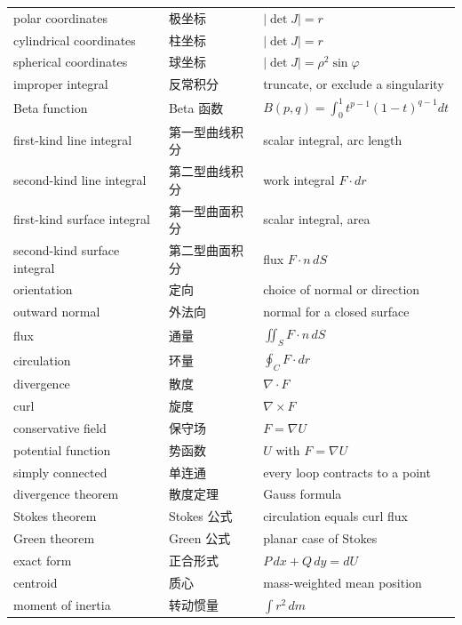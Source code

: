 \documentclass[UTF8,11pt,a4paper]{ctexart}
\begin{document}
\begin{longtable}{@{}p{}p{}p{}@{}}
polar coordinates & 极坐标 & $|\det J|=r$ \\
cylindrical coordinates & 柱坐标 & $|\det J|=r$ \\
spherical coordinates & 球坐标 & $|\det J|=\rho^2\sin\varphi$ \\
improper integral & 反常积分 & truncate, or exclude a singularity \\
Beta function & Beta 函数 & $B(p,q)=\int_0^1t^{p-1}(1-t)^{q-1}dt$ \\
first-kind line integral & 第一型曲线积分 & scalar integral, arc length \\
second-kind line integral & 第二型曲线积分 & work integral $F\cdot dr$ \\
first-kind surface integral & 第一型曲面积分 & scalar integral, area \\
second-kind surface integral & 第二型曲面积分 & flux $F\cdot n\,dS$ \\
orientation & 定向 & choice of normal or direction \\
outward normal & 外法向 & normal for a closed surface \\
flux & 通量 & $\iint_SF\cdot n\,dS$ \\
circulation & 环量 & $\oint_CF\cdot dr$ \\
divergence & 散度 & $\nabla\cdot F$ \\
curl & 旋度 & $\nabla\times F$ \\
conservative field & 保守场 & $F=\nabla U$ \\
potential function & 势函数 & $U$ with $F=\nabla U$ \\
simply connected & 单连通 & every loop contracts to a point \\
divergence theorem & 散度定理 & Gauss formula \\
Stokes theorem & Stokes 公式 & circulation equals curl flux \\
Green theorem & Green 公式 & planar case of Stokes \\
exact form & 正合形式 & $P\,dx+Q\,dy=dU$ \\
centroid & 质心 & mass-weighted mean position \\
moment of inertia & 转动惯量 & $\int r^2\,dm$ \\
\bottomrule
\end{longtable}
\endgroup
\end{document}
